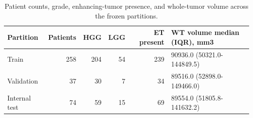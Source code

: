 \begin{table}[htbp]
\caption{Patient counts, grade, enhancing-tumor presence, and whole-tumor volume across the frozen partitions.}
\label{tab:table01_cohort_characteristics}
\begin{tabular}{lrrrrl}
\toprule
Partition & Patients & HGG & LGG & ET present & WT volume median (IQR), mm3 \\
\midrule
Train & 258 & 204 & 54 & 239 & 90936.0 (50321.0-144849.5) \\
Validation & 37 & 30 & 7 & 34 & 89516.0 (52898.0-149466.0) \\
Internal test & 74 & 59 & 15 & 69 & 89554.0 (51805.8-141632.2) \\
\bottomrule
\end{tabular}
\end{table}
